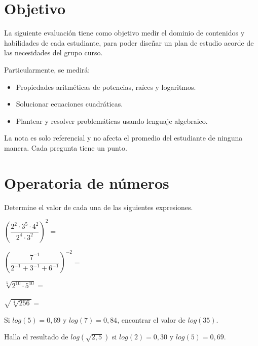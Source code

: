 \documentclass[sin curso]{srs}
\begin{document}
\section{Objetivo}

La siguiente evaluación tiene como objetivo medir el dominio de contenidos y habilidades
de cada estudiante, para poder diseñar un plan de estudio acorde de las necesidades del
grupo curso.

Particularmente, se medirá:
\begin{itemize}[nosep]
  \item Propiedades aritméticas de potencias, raíces y logaritmos.
  \item Solucionar ecuaciones cuadráticas.
  \item Plantear y resolver problemáticas usando lenguaje algebraico.
\end{itemize}

La nota es solo referencial y no afecta el promedio del estudiante de ninguna manera. Cada
pregunta tiene un punto.

\section{Operatoria de números}

Determine el valor de cada una de las siguientes expresiones.
\begin{preguntas}
  \pregunta $\left(\dfrac{2^2\cdot 3^5\cdot 4^2}{2^4\cdot 3^2}\right)^2 =$
  \begin{malla}[height=6cm]
  \end{malla}
  \pregunta $\left(\dfrac{7^{-1}}{2^{-1}+3^{-1}+6^{-1}}\right)^{-2} =$
  \begin{malla}[height=6cm]
  \end{malla}
  \pregunta $\sqrt[5]{2^{10}\cdot 5^{10}} =$
  \begin{malla}[height=6cm]
  \end{malla}
  \pregunta $\sqrt{\sqrt[4]{256}} =$
  \begin{malla}[height=6cm]
  \end{malla}
  \pregunta Si $log(5) = 0,69$ y $log(7)=0,84$, encontrar el valor de $log(35)$.
  \begin{malla}[height=6cm]
  \end{malla}
  \pregunta Halla el resultado de $log(\sqrt{2,5})$ si $log(2)=0,30$ y $log(5)=0,69$.
  \begin{malla}[height=6cm]
  \end{malla}
\end{preguntas}
\end{document}
